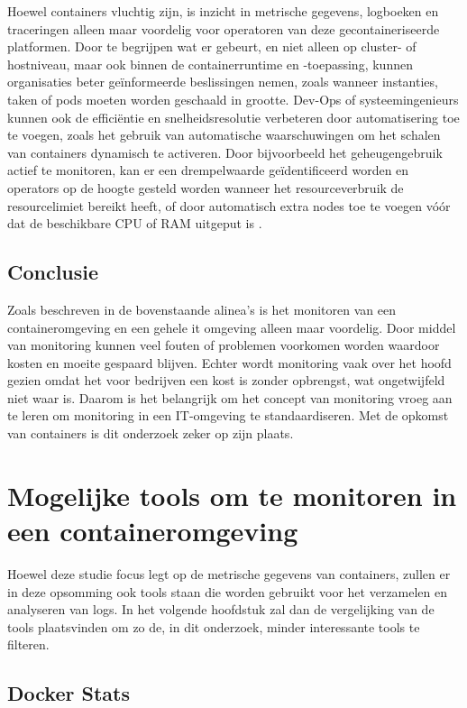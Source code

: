 Hoewel containers vluchtig zijn, is inzicht in metrische gegevens, logboeken en traceringen alleen maar voordelig voor operatoren van deze gecontaineriseerde platformen. Door te begrijpen wat er gebeurt, en niet alleen op cluster- of hostniveau, maar ook binnen de containerruntime en -toepassing, kunnen organisaties beter geïnformeerde beslissingen nemen, zoals wanneer instanties, taken of pods moeten worden geschaald in grootte. Dev-Ops of systeemingenieurs kunnen ook de efficiëntie en snelheidsresolutie verbeteren door automatisering toe te voegen, zoals het gebruik van automatische waarschuwingen om het schalen van containers dynamisch te activeren. Door bijvoorbeeld het geheugengebruik actief te monitoren, kan er een drempelwaarde geïdentificeerd worden en operators op de hoogte gesteld worden wanneer het resourceverbruik de resourcelimiet bereikt heeft, of door automatisch extra nodes toe te voegen vóór dat de beschikbare CPU of RAM uitgeput is \autocite{AWS2021}. 

\subsection{Conclusie}

Zoals beschreven in de bovenstaande alinea's is het monitoren van een containeromgeving en een gehele it omgeving alleen maar voordelig.  Door middel van monitoring kunnen veel fouten of problemen voorkomen worden waardoor kosten en moeite gespaard blijven. Echter wordt monitoring vaak over het hoofd gezien omdat het voor bedrijven een kost is zonder opbrengst, wat ongetwijfeld niet waar is. Daarom is het belangrijk om het concept van monitoring vroeg aan te leren om monitoring in een IT-omgeving te standaardiseren. Met de opkomst van containers is dit onderzoek zeker op zijn plaats.

\section{Mogelijke tools om te monitoren in een containeromgeving}\label{lab:tools}

Hoewel deze studie focus legt op de metrische gegevens van containers, zullen er in deze opsomming ook tools staan die worden gebruikt voor het verzamelen en analyseren van logs. In het volgende hoofdstuk zal dan de vergelijking van de tools plaatsvinden om zo de, in dit onderzoek, minder interessante tools te filteren.

\subsection{Docker Stats}

